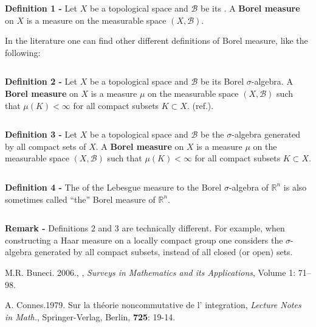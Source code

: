 \documentclass[12pt]{article}
\begin{document}

{\bf Definition 1 -} Let $X$ be a topological space and $\mathcal{B}$ be its .  A {\bf Borel measure} on $X$ is a measure on the measurable space $(X,\mathcal{B})$.

In the literature one can find other different definitions of Borel measure, like the following:

$\,$

\textbf{Definition 2 -} Let $X$ be a topological space and $\mathcal{B}$ be its Borel $\sigma$-algebra. A {\bf Borel measure} on $X$ is a measure $\mu$ on the measurable space $(X,\mathcal{B})$ such that $\mu (K) < \infty$ for all compact subsets $K \subset X$. (ref.\cite{MRB2k6}).

$\,$

\textbf{Definition 3 -} Let $X$ be a topological space and $\mathcal{B}$ be the $\sigma$-algebra generated by all compact sets of $X$. A {\bf Borel measure} on $X$ is a measure $\mu$ on the measurable space $(X,\mathcal{B})$ such that $\mu (K) < \infty$ for all compact subsets $K \subset X$.

$\,$

{\bf Definition 4 -} The  of the Lebesgue measure to the Borel $\sigma$-algebra of $\mathbb{R}^n$ is also sometimes called ``the'' Borel measure of $\mathbb{R}^n$.

$\,$

{\bf Remark -} Definitions $2$ and $3$ are technically different. For example, when constructing a Haar measure on a locally compact group one considers the $\sigma$-algebra generated by all compact subsets, instead of all closed (or open) sets.

\begin{thebibliography}{9}

M.R. Buneci. 2006., 
, 
{\em Surveys in Mathematics and its Applications}, Volume 1: 71--98.

A. Connes.1979. Sur la th\'eorie noncommutative de l' integration, {\em Lecture Notes in
Math.},  Springer-Verlag, Berlin, {\bf 725}: 19-14.

\end{thebibliography}

\end{document}
